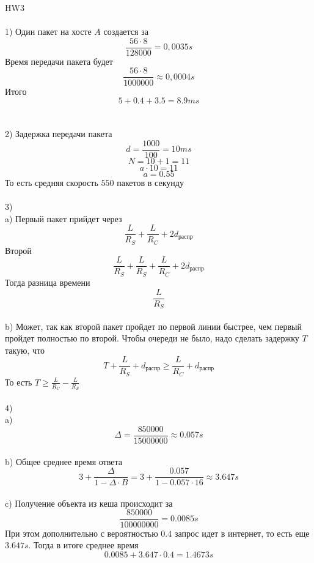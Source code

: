 \documentclass[a4paper,11pt]{article}
\begin{document}
\Large
HW3 \\\\
1) Один пакет на хосте $A$ создается за $$\frac{56 \cdot 8}{128000} = 0,0035 s$$
Время передачи пакета будет $$\frac{56 \cdot 8}{1000000} \approx 0,0004 s$$
Итого $$5 + 0.4 + 3.5 = 8.9 ms$$
\\\\
2) Задержка передачи пакета $$d = \frac{1000}{100} = 10 ms$$
$$N = 10 + 1 = 11$$
$$a \cdot 10 = 11$$
$$a = 0.55$$
То есть средняя скорость $550$ пакетов в секунду
\\\\
3) \\ 
a) Первый пакет прийдет через $$\frac{L}{R_S} + \frac{L}{R_C} + 2 d_{\text{распр}}$$
Второй $$\frac{L}{R_S} + \frac{L}{R_S} + \frac{L}{R_C} +  2 d_{\text{распр}}$$
Тогда разница времени $$\frac{L}{R_S}$$
\\
b) Может, так как второй пакет пройдет по первой линии быстрее, чем первый пройдет полностью по второй. Чтобы очереди не было, надо сделать задержку $T$ такую, что $$T + \frac{L}{R_S} + d_{\text{распр}} \geq \frac{L}{R_C} + d_{\text{распр}}$$ То есть $T \geq \frac{L}{R_C} - \frac{L}{R_S}$
\\\\
4) \\
a) $$\Delta = \frac{850000}{15000000} \approx 0.057 s$$
\\
b) Общее среднее время ответа $$3 + \frac{\Delta}{1 - \Delta \cdot B} = 3 + \frac{0.057}{1 - 0.057 \cdot 16} \approx 3.647 s$$
\\
c) Получение объекта из кеша происходит за $$\frac{850000}{100000000} = 0.0085 s$$
При этом дополнительно с вероятностью $0.4$ запрос идет в интернет, то есть еще $3.647 s$. Тогда в итоге среднее время $$0.0085 + 3.647 \cdot 0.4 = 1.4673 s$$
\end{document}
